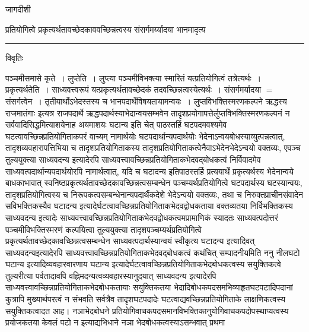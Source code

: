\documentclass[10pt, openany]{book}
\begin{document}
{\newpage
\begin{center} जागदीशी \end{center}
{\la प्रतियोगित्वे प्रकृत्यर्थतावच्छेदकाववच्छिन्नत्वस्य संसर्गमर्य्यादया भानमादृत्य}\\
\hrule
\begin{center}     विवृतिः \end{center}
पञ्चमीसमासे कृते~। लुप्तेति~। लुप्त्या पञ्चमीविभक्त्या स्मारितं यत्प्रतियोगित्वं तत्रेत्यर्थः~। प्रकृत्यर्थतेति~। साध्यवत्त्वरूपं यत्प्रकृत्यर्थतावच्छेदकं तदवच्छिन्नत्वस्येत्यर्थः~। संसर्गमर्यादया $=$ संसर्गत्वेन~। तृतीयार्थोऽभेदस्तस्य च भानपदार्थेविषयतायामन्वयः~। लुप्तविभक्तिस्मरणकल्पने {\qt ऋद्धस्य राजमातंगाः} इत्यत्र
राजपदार्थे ऋद्धपदार्थस्याभेदान्वयसम्भवेन तादृशप्रयोगापत्तेर्लुप्तविभक्तिस्मरणकल्पनं न सर्ववादिसिद्धमित्याशयेनाह
{\qt अयमाशयः } घटान्य इति चेत् पाठस्तर्हि घटपदमवश्यमेव घटत्वावच्छिन्नप्रतियोगिताकपरं वाच्यम् नामार्थयोः घटपदार्थान्यपदार्थयोः भेदेनाऽन्वयबोधस्याव्युत्पन्नत्वात्, तादृशव्यवहारापत्तिभिया च तादृशप्रतियोगिताकस्य तादृशप्रतियोगिताकत्वेनैवाऽभेदेनभेदेऽन्वयो वक्तव्यः, एवञ्च तुल्ययुक्त्या
{\qt साध्यवदन्य}  इत्यादेरपि साध्यवत्त्वावच्छिन्नप्रतियोगिताकभेदवद्बोधकत्वं निर्विवादमेव साध्यवत्पदार्थान्यपदार्थयोरपि नामार्थत्वात्, यदि च {\qt घटादन्य }इतिपाठस्तर्हि प्रत्ययार्थे प्रकृत्यर्थस्य भेदेनान्वये बाधकाभावात् स्वनिष्ठप्रकृत्यर्थतावच्छेदकावच्छिन्नत्वसम्बन्धेन पञ्चम्यर्थप्रतियोगित्वे घटपदार्थस्य घटस्यान्वयः, तादृशप्रतियोगित्वस्य च निरूपकत्वसम्बन्धेनान्यपदार्थैकदेशे भेदेऽन्वयो वक्तव्यः, तथा च निरुक्तप्राचीनसंवादेन सविभक्तिकस्यैव {\qt घटादन्य} इत्यादेर्घटत्वावच्छिन्नप्रतियोगिताकभेदवद्वोधकताया वक्तव्यतया निर्विभक्तिकस्य {\qt साध्यवदन्य} इत्यादेः साध्यवत्त्वावच्छिन्नप्रतियोगिताकभेदवद्वोधकत्वमप्रामाणिकं स्यादतः साध्यवत्पदोत्तरं पञ्चमीविभक्तिस्मरणं कल्पयित्वा तुल्ययुक्त्या तादृशपञ्चम्यर्थप्रतियोगित्वे प्रकृत्यर्थतावच्छेदकावच्छिन्नत्वसम्बन्धेन साध्यवत्पदार्थस्यान्वयं स्वीकृत्य {\qt घटादन्य} इत्यादिवत् साध्यवदन्यइत्यादेरपि साध्यवत्त्वावच्छिन्नप्रतियोगिताकभेदवद्बोधकत्वं कथंचित् सम्पादनीयमिति ननु {\qt नीलघटो घटान्य} इत्यादिव्यवहारवारणाय {\qt घटान्य} इत्यादेर्घटत्वावच्छिन्नप्रतियोगिताकभेदबोधकत्वस्य सयुक्तिकत्वे तुल्यरीत्या पर्वतादावपि वह्निमदन्यत्वव्यवहारस्यानुदयात् {\qt साध्यवदन्य} इत्यादेरपि
साध्यवत्त्वावच्छिन्नप्रतियोगिताकभेदबोधकतायाः सयुक्तिकतया भेदादिबोधकपदसमभिव्याहृतघटपटादिपदानां कुत्रापि मुख्यार्थपरत्वं न संभवति सर्वत्रैव तादृशघटपदादेः
घटत्वाद्यवच्छिन्नप्रतियोगिताके लाक्षणिकत्वस्य सयुक्तिकत्वादत आह। नञाभेदबोधने प्रतियोगिवाचकपदसमानविभक्तिकानुयोगिवाचकपदोपस्थाप्यत्वस्य प्रयोजकतया केवलं {\qt पटो न} इत्याद्यभिधाने नञा भेदबोधकत्वस्याऽसम्भवात् प्रथमा\textendash
}
\end{document}
